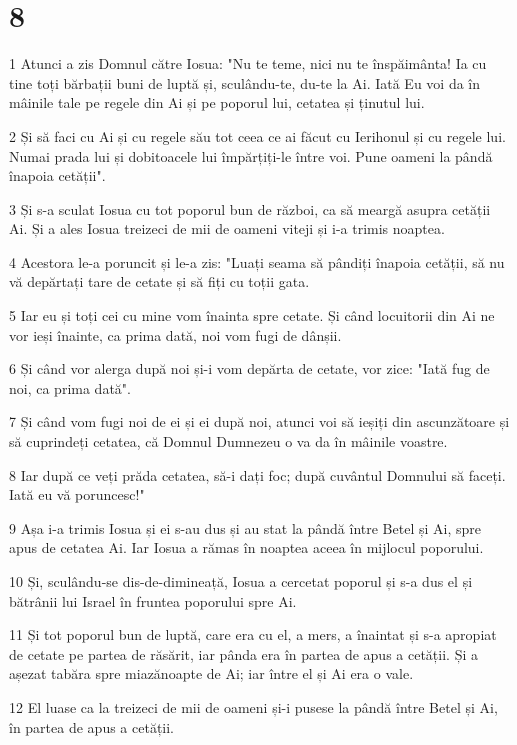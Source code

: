 \chapter{8}

\par 1 Atunci a zis Domnul către Iosua: "Nu te teme, nici nu te înspăimânta! Ia cu tine toți bărbații buni de luptă și, sculându-te, du-te la Ai. Iată Eu voi da în mâinile tale pe regele din Ai și pe poporul lui, cetatea și ținutul lui.
\par 2 Și să faci cu Ai și cu regele său tot ceea ce ai făcut cu Ierihonul și cu regele lui. Numai prada lui și dobitoacele lui împărțiți-le între voi. Pune oameni la pândă înapoia cetății".
\par 3 Și s-a sculat Iosua cu tot poporul bun de război, ca să meargă asupra cetății Ai. Și a ales Iosua treizeci de mii de oameni viteji și i-a trimis noaptea.
\par 4 Acestora le-a poruncit și le-a zis: "Luați seama să pândiți înapoia cetății, să nu vă depărtați tare de cetate și să fiți cu toții gata.
\par 5 Iar eu și toți cei cu mine vom înainta spre cetate. Și când locuitorii din Ai ne vor ieși înainte, ca prima dată, noi vom fugi de dânșii.
\par 6 Și când vor alerga după noi și-i vom depărta de cetate, vor zice: "Iată fug de noi, ca prima dată".
\par 7 Și când vom fugi noi de ei și ei după noi, atunci voi să ieșiți din ascunzătoare și să cuprindeți cetatea, că Domnul Dumnezeu o va da în mâinile voastre.
\par 8 Iar după ce veți prăda cetatea, să-i dați foc; după cuvântul Domnului să faceți. Iată eu vă poruncesc!"
\par 9 Așa i-a trimis Iosua și ei s-au dus și au stat la pândă între Betel și Ai, spre apus de cetatea Ai. Iar Iosua a rămas în noaptea aceea în mijlocul poporului.
\par 10 Și, sculându-se dis-de-dimineață, Iosua a cercetat poporul și s-a dus el și bătrânii lui Israel în fruntea poporului spre Ai.
\par 11 Și tot poporul bun de luptă, care era cu el, a mers, a înaintat și s-a apropiat de cetate pe partea de răsărit, iar pânda era în partea de apus a cetății. Și a așezat tabăra spre miazănoapte de Ai; iar între el și Ai era o vale.
\par 12 El luase ca la treizeci de mii de oameni și-i pusese la pândă între Betel și Ai, în partea de apus a cetății.
